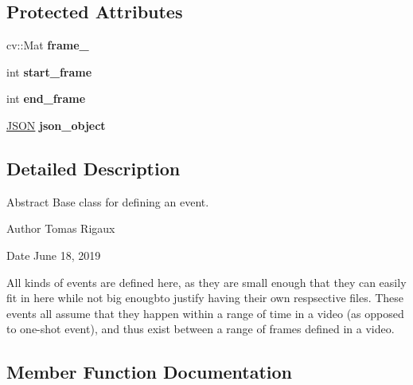 \subsection*{Protected Attributes}
\begin{DoxyCompactItemize}
\item 
\mbox{\label{class_event_builder_af86d725257e3e3bf6dbec84fd4faf459}} 
cv\+::\+Mat {\bfseries frame\+\_\+}
\item 
\mbox{\label{class_event_builder_a000a39f5141ad72f2c4b5b8a462df435}} 
int {\bfseries start\+\_\+frame}
\item 
\mbox{\label{class_event_builder_a901d364c835db2f8701c8ba5cad1a6c2}} 
int {\bfseries end\+\_\+frame}
\item 
\mbox{\label{class_event_builder_a44f238dcb7485572f696009ae4c1d9c2}} 
\mbox{\hyperlink{class_j_s_o_n}{J\+S\+ON}} {\bfseries json\+\_\+object}
\end{DoxyCompactItemize}


\subsection{Detailed Description}
Abstract Base class for defining an event. 

\begin{DoxyAuthor}{Author}
Tomas Rigaux 
\end{DoxyAuthor}
\begin{DoxyDate}{Date}
June 18, 2019
\end{DoxyDate}
All kinds of events are defined here, as they are small enough that they can easily fit in here while not big enougbto justify having their own respsective files. These events all assume that they happen within a range of time in a video (as opposed to one-\/shot event), and thus exist between a range of frames defined in a video. 

\subsection{Member Function Documentation}
\mbox{\label{class_event_builder_ac55f925287ac8aed2d5303706444251e}} 
